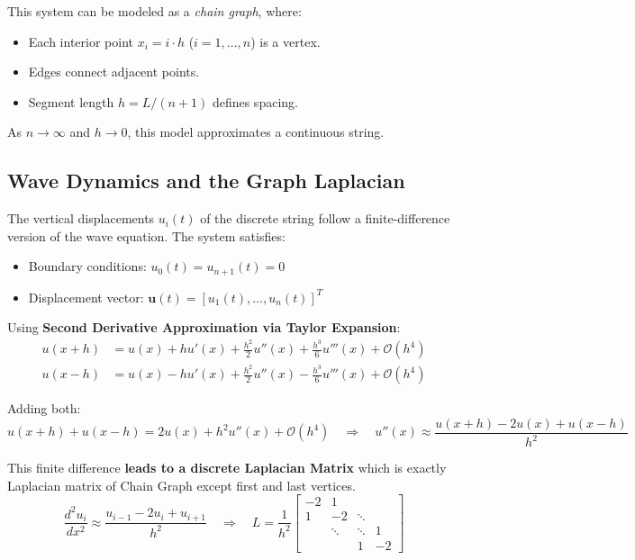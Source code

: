 \documentclass[hidelinks,12pt]{article}
\begin{document}
\noindent This system can be modeled as a \textit{chain graph}, where:
\begin{itemize}
    \item Each interior point \( x_i = i \cdot h \) (\( i=1,\dots,n \)) is a vertex.
    \item Edges connect adjacent points.
    \item Segment length \( h = L / (n+1) \) defines spacing.
\end{itemize}

\noindent As \( n \to \infty \) and \( h \to 0 \), this model approximates a continuous string.

\subsection*{Wave Dynamics and the Graph Laplacian}

The vertical displacements \( u_i(t) \) of the discrete string follow a finite-difference version of the wave equation. The system satisfies:
\begin{itemize}
    \item Boundary conditions: \( u_0(t) = u_{n+1}(t) = 0 \)
    \item Displacement vector: \( \mathbf{u}(t) = [u_1(t), \dots, u_n(t)]^T \)
\end{itemize}

\newpage

\noindent Using \textbf{Second Derivative Approximation via Taylor Expansion}:
\begin{align*}
u(x+h) &= u(x) + h u'(x) + \frac{h^2}{2}u''(x) + \frac{h^3}{6}u'''(x) + \mathcal{O}(h^4) \\
u(x-h) &= u(x) - h u'(x) + \frac{h^2}{2}u''(x) - \frac{h^3}{6}u'''(x) + \mathcal{O}(h^4)
\end{align*}

\noindent Adding both:
\[
u(x+h) + u(x-h) = 2u(x) + h^2 u''(x) + \mathcal{O}(h^4)
\quad \Rightarrow \quad
u''(x) \approx \frac{u(x+h) - 2u(x) + u(x-h)}{h^2}
\]


\noindent This finite difference \textbf{leads to a discrete Laplacian Matrix} which is exactly Laplacian matrix of Chain Graph except first and last vertices. 
\[
\frac{d^2 u_i}{dx^2} \approx \frac{u_{i-1} - 2u_i + u_{i+1}}{h^2}
\quad \Rightarrow \quad
L = \frac{1}{h^2}
\begin{bmatrix}
-2 & 1 & & \\
1 & -2 & \ddots & \\
 & \ddots & \ddots & 1 \\
 & & 1 & -2
\end{bmatrix}
\]
\end{document}
